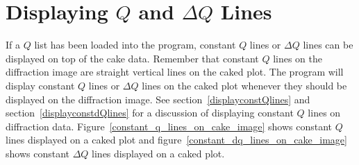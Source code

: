 \section{\texorpdfstring{Displaying $Q$ and $\Delta Q$ Lines}
    {Displaying Q and delta Q Lines}}
    \label{cakeQlinesandpeaks}

If a $Q$ list has been loaded into the program, 
constant $Q$ lines or $\Delta Q$ lines can be 
displayed on top of the cake data. Remember that 
constant $Q$ lines on the diffraction image are straight
vertical lines on the caked plot. 
The program will display constant $Q$ lines or 
$\Delta Q$ lines on the caked plot whenever they 
should be displayed on the diffraction image. See 
section~\ref{displayconstQlines} and 
section~\ref{displayconstdQlines} for a discussion of 
displaying constant $Q$ lines on diffraction data.
Figure~\ref{constant_q_lines_on_cake_image} shows constant
$Q$ lines displayed on a caked plot and 
figure~\ref{constant_dq_lines_on_cake_image} shows constant
$\Delta Q$ lines displayed on a caked plot.


